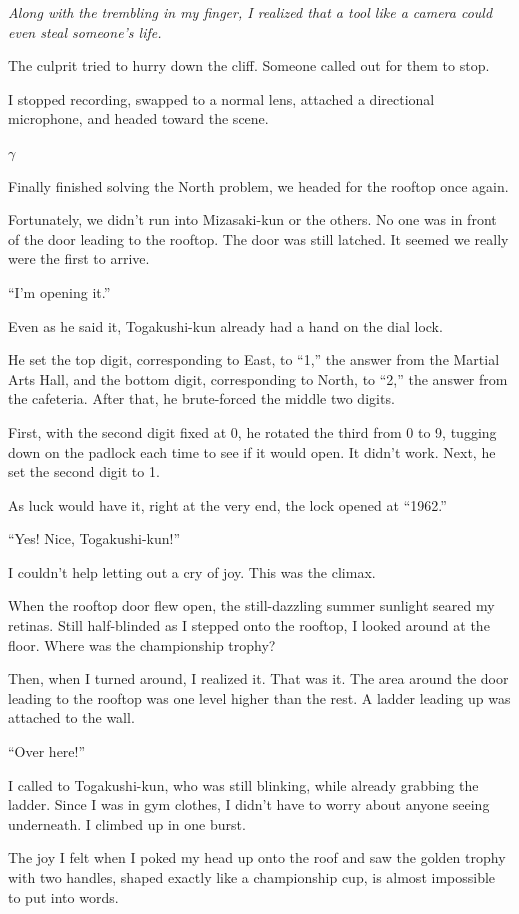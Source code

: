 \documentclass[
    a4paper,
    12pt,
    twoside,
    openany,
    UTF8,
    fontset=windows
]{ctexbook}
\begin{document}
\textit{Along with the trembling in my finger, I realized that a tool like a camera could even steal someone's life.}

The culprit tried to hurry down the cliff. Someone called out for them to stop.

I stopped recording, swapped to a normal lens, attached a directional microphone, and headed toward the scene.

$\gamma$

Finally finished solving the North problem, we headed for the rooftop once again.

Fortunately, we didn't run into Mizasaki-kun or the others. No one was in front of the door leading to the rooftop. The door was still latched. It seemed we really were the first to arrive.

``I'm opening it.''

Even as he said it, Togakushi-kun already had a hand on the dial lock.

He set the top digit, corresponding to East, to ``1,'' the answer from the Martial Arts Hall, and the bottom digit, corresponding to North, to ``2,'' the answer from the cafeteria. After that, he brute-forced the middle two digits.

First, with the second digit fixed at 0, he rotated the third from 0 to 9, tugging down on the padlock each time to see if it would open. It didn't work. Next, he set the second digit to 1.

As luck would have it, right at the very end, the lock opened at ``1962.''

``Yes! Nice, Togakushi-kun!''

I couldn't help letting out a cry of joy. This was the climax.

When the rooftop door flew open, the still-dazzling summer sunlight seared my retinas. Still half-blinded as I stepped onto the rooftop, I looked around at the floor. Where was the championship trophy?

Then, when I turned around, I realized it. That was it. The area around the door leading to the rooftop was one level higher than the rest. A ladder leading up was attached to the wall.

``Over here!''

I called to Togakushi-kun, who was still blinking, while already grabbing the ladder. Since I was in gym clothes, I didn't have to worry about anyone seeing underneath. I climbed up in one burst.

The joy I felt when I poked my head up onto the roof and saw the golden trophy with two handles, shaped exactly like a championship cup, is almost impossible to put into words.
\end{document}
